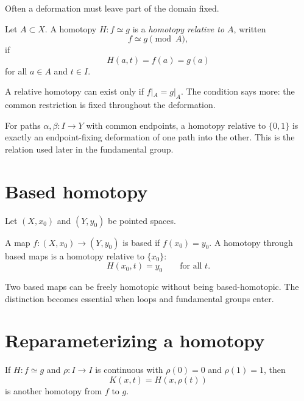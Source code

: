 Often a deformation must leave part of the domain fixed.

\begin{definition}
\label{def:viii01-relative}
Let \(A\subset X\).  A homotopy \(H:f\simeq g\) is a \emph{homotopy relative to
\(A\)}, written
\[
f\simeq g\pmod A,
\]
if
\[
H(a,t)=f(a)=g(a)
\]
for all \(a\in A\) and \(t\in I\).
\end{definition}

\begin{remark}
A relative homotopy can exist only if \(f|_A=g|_A\).  The condition says more:
the common restriction is fixed throughout the deformation.
\end{remark}

\begin{example}
\label{ex:viii01-fixed-endpoints}
For paths \(\alpha,\beta:I\to Y\) with common endpoints, a homotopy relative to
\(\{0,1\}\) is exactly an endpoint-fixing deformation of one path into the other.
This is the relation used later in the fundamental group.
\end{example}

\section{Based homotopy}

Let \((X,x_0)\) and \((Y,y_0)\) be pointed spaces.

\begin{definition}
\label{def:viii01-based}
A map \(f:(X,x_0)\to(Y,y_0)\) is based if \(f(x_0)=y_0\).  A homotopy through
based maps is a homotopy relative to \(\{x_0\}\):
\[
H(x_0,t)=y_0
\qquad\text{for all }t.
\]
\end{definition}

\begin{warning}
\label{warn:viii01-free-based}
Two based maps can be freely homotopic without being based-homotopic.  The
distinction becomes essential when loops and fundamental groups enter.
\end{warning}

\section{Reparameterizing a homotopy}

\begin{lemma}
\label{lem:viii01-reparam}
If \(H:f\simeq g\) and \(\rho:I\to I\) is continuous with
\(\rho(0)=0\) and \(\rho(1)=1\), then
\[
K(x,t)=H(x,\rho(t))
\]
is another homotopy from \(f\) to \(g\).
\end{lemma}

